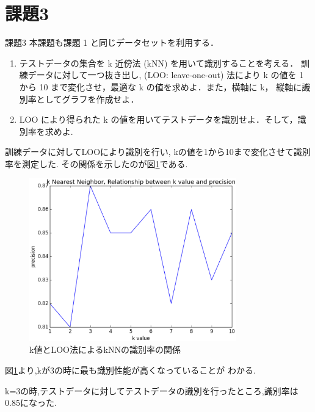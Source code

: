 \section{課題3}
\begin{itembox}{課題3}
  本課題も課題 1 と同じデータセットを利用する．
  \begin{enumerate}
    \item テストデータの集合を k 近傍法 (kNN) を用いて識別することを考える． 訓練データに対して一つ抜き出し, (LOO: leave-one-out) 法により k の値を 1 から 10 まで変化させ，最適な k の値を求めよ．また，横軸に k， 縦軸に識別率としてグラフを作成せよ．
    \item LOO により得られた k の値を用いてテストデータを識別せよ．そして，識別率を求めよ.
  \end{enumerate}
\end{itembox}
訓練データに対してLOOにより識別を行い, kの値を1から10まで変化させて識別率を測定した. 
その関係を示したのが図\ref{fig:kadai3}である. 
\begin{figure}[htbp]
  \centering
  \includegraphics[width=0.8\textwidth]{./assets/kadai3_various_kvalue_20150121_231435.eps}
  \caption{k値とLOO法によるkNNの識別率の関係}
  \label{fig:kadai3}
\end{figure}
図\ref{fig:kadai3}より,kが3の時に最も識別性能が高くなっていることが
わかる.

k=3の時,テストデータに対してテストデータの識別を行ったところ,識別率は
0.85になった.

